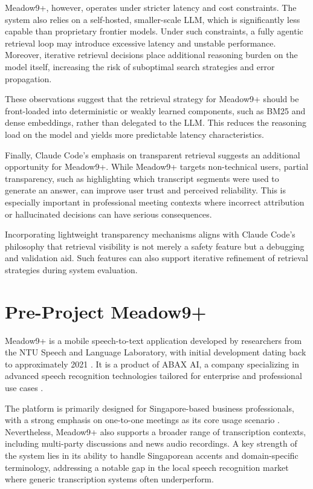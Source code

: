 Meadow9+, however, operates under stricter latency and cost constraints. The system also relies on a self-hosted, smaller-scale LLM, which is significantly less capable than proprietary frontier models. Under such constraints, a fully agentic retrieval loop may introduce excessive latency and unstable performance. Moreover, iterative retrieval decisions place additional reasoning burden on the model itself, increasing the risk of suboptimal search strategies and error propagation.

These observations suggest that the retrieval strategy for Meadow9+ should be front-loaded into deterministic or weakly learned components, such as BM25 and dense embeddings, rather than delegated to the LLM. This reduces the reasoning load on the model and yields more predictable latency characteristics.

Finally, Claude Code’s emphasis on transparent retrieval suggests an additional opportunity for Meadow9+. While Meadow9+ targets non-technical users, partial transparency, such as highlighting which transcript segments were used to generate an answer, can improve user trust and perceived reliability. This is especially important in professional meeting contexts where incorrect attribution or hallucinated decisions can have serious consequences.

Incorporating lightweight transparency mechanisms aligns with Claude Code’s philosophy that retrieval visibility is not merely a safety feature but a debugging and validation aid. Such features can also support iterative refinement of retrieval strategies during system evaluation.

\section{Pre-Project Meadow9+}
Meadow9+ is a mobile speech-to-text application developed by researchers from the NTU Speech and Language Laboratory, with initial development dating back to approximately 2021 \cite{meadow9_appstore_au,abax_ai_site}. It is a product of ABAX AI, a company specializing in advanced speech recognition technologies tailored for enterprise and professional use cases \cite{abax_ai_site,abax_ai_companies_sg}.

The platform is primarily designed for Singapore-based business professionals, with a strong emphasis on one-to-one meetings as its core usage scenario \cite{meadow9_appstore_au,abax_ai_site,abax_ai_companies_sg}. Nevertheless, Meadow9+ also supports a broader range of transcription contexts, including multi-party discussions and news audio recordings. A key strength of the system lies in its ability to handle Singaporean accents and domain-specific terminology, addressing a notable gap in the local speech recognition market where generic transcription systems often underperform.

